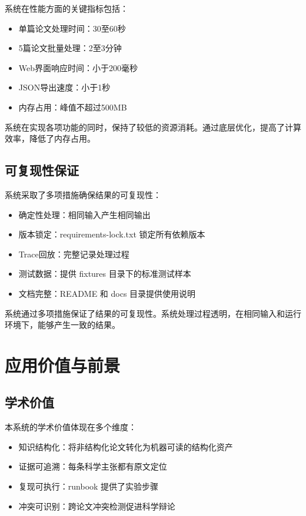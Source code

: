 ﻿\documentclass[a4paper,12pt]{article}
\begin{document}
系统在性能方面的关键指标包括：

\begin{itemize}
    \item 单篇论文处理时间：30至60秒
    \item 5篇论文批量处理：2至3分钟
    \item Web界面响应时间：小于200毫秒
    \item JSON导出速度：小于1秒
    \item 内存占用：峰值不超过500MB
\end{itemize}

系统在实现各项功能的同时，保持了较低的资源消耗。通过底层优化，提高了计算效率，降低了内存占用。

\subsection{可复现性保证}

系统采取了多项措施确保结果的可复现性：

\begin{itemize}
    \item 确定性处理：相同输入产生相同输出
    \item 版本锁定：requirements-lock.txt 锁定所有依赖版本
    \item Trace回放：完整记录处理过程
    \item 测试数据：提供 fixtures 目录下的标准测试样本
    \item 文档完整：README 和 docs 目录提供使用说明
\end{itemize}

系统通过多项措施保证了结果的可复现性。系统处理过程透明，在相同输入和运行环境下，能够产生一致的结果。

\section{应用价值与前景}

\subsection{学术价值}

本系统的学术价值体现在多个维度：

\begin{itemize}
    \item 知识结构化：将非结构化论文转化为机器可读的结构化资产
    \item 证据可追溯：每条科学主张都有原文定位
    \item 复现可执行：runbook 提供了实验步骤
    \item 冲突可识别：跨论文冲突检测促进科学辩论
\end{itemize}
\end{document}
